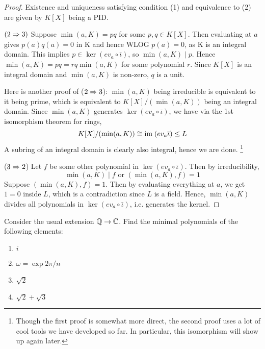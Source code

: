 \documentclass[../book.tex]{subfiles}
\begin{document}
\begin{proof}
    Existence and uniqueness satisfying condition (1) and equivalence to (2) 
    are given by $K[X]$ being a PID. 
    
    $(2 \Rightarrow 3)$
    Suppose $\min(a,K)=pq$ for some $p,q \in K[X]$.
    Then evaluating at $a$ gives $p(a)q(a)=0$ in K and hence WLOG $p(a)=0$,
    as K is an integral domain.
    This implies $p \in \ker(ev_a \circ \bar\iota)$, so $\min(a,K) \mid p$.
    Hence $\min(a,K) = pq = rq \min(a,K)$ for some polynomial $r$.
    Since $K[X]$ is an integral domain and $\min(a,K)$ is non-zero, $q$ is a unit.
    
    Here is another proof of ($2 \Rightarrow 3$):
    $\min(a,K)$ being irreducible is equivalent to it being prime,
    which is equivalent to $K[X]/(\min(a,K))$ being an integral domain.
    Since $\min(a,K)$ generates $\ker(ev_a \circ \bar\iota)$, 
    we have via the 1st isomorphism theorem for rings, \[
        K[X]/(\min(a,K)) \cong \textnormal{im}\; (ev_a \overline{\iota}) \leq L
    \]
    A subring of an integral domain is clearly also integral, hence we are done.
    \footnote{Though the first proof is somewhat more direct, 
    the second proof uses a lot of cool tools we have developed so far. 
    In particular, this isomorphism will show up again later.}
    
    ($3 \Rightarrow 2$)
    Let $f$ be some other polynomial in $\ker(ev_a \circ\bar\iota)$.
    Then by irreducibility, 
    \[\min(a, K) \mid f \text{ or } (\min(a,K),f) = 1\]
    Suppose $(\min(a,K),f) = 1$. 
    Then by evaluating everything at $a$, we get $1 = 0$ inside $L$,
    which is a contradiction since $L$ is a field. 
    Hence, $\min(a,K)$ divides all polynomials in $\ker(ev_a \circ \bar\iota)$,
    i.e. generates the kernel.
\end{proof}
\begin{ex}
    
    Consider the usual extension $\mathbb{Q} \to \mathbb{C}$.
    Find the minimal polynomials of the following elements: \begin{enumerate}
        \item $i$
        \item $\omega = \exp{2\pi / n}$
        \item $\sqrt{2}$
        \item $\sqrt{2} + \sqrt{3}$
    \end{enumerate}
    
\end{ex}
\end{document}

